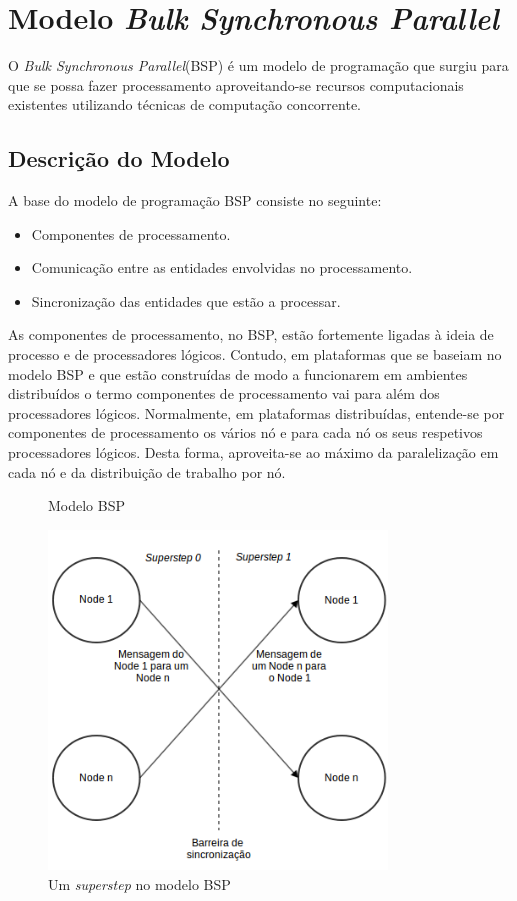 \chapter{Modelo \textit{Bulk Synchronous Parallel}}

O \textit{Bulk Synchronous Parallel}(BSP) é um modelo de programação que 
surgiu para que se possa fazer processamento aproveitando-se recursos 
computacionais existentes utilizando técnicas de computação concorrente.

\section{Descrição do Modelo}

A base do modelo de programação BSP consiste no seguinte:
\begin{itemize} 
 \item Componentes de processamento.
 \item Comunicação entre as entidades envolvidas no processamento.
 \item Sincronização das entidades que estão a processar.
\end{itemize}

As componentes de processamento, no BSP, estão fortemente ligadas à ideia de 
processo e de processadores lógicos. Contudo, em plataformas que se baseiam no 
modelo BSP e que estão construídas de modo a funcionarem em ambientes 
distribuídos o termo componentes de processamento vai para além dos 
processadores lógicos. Normalmente, em plataformas distribuídas, entende-se por 
componentes de processamento os vários nó e para cada nó
os seus respetivos processadores lógicos. Desta forma, aproveita-se ao máximo 
da paralelização em cada nó e da distribuição de trabalho por nó.

\begin{figure}
 \caption{Modelo BSP}
	\centering
 \includegraphics[width=90mm]{bspmodel.png}
	\caption{Um \textit{superstep} no modelo BSP}
 \label{fig:bspmodel}
\end{figure}

